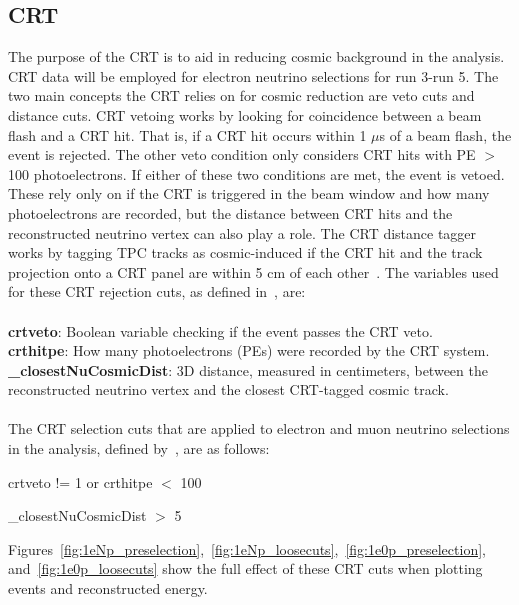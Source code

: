 \subsection{CRT}
The purpose of the CRT is to aid in reducing cosmic background in the analysis. CRT data will be employed for electron neutrino selections for run 3-run 5. The two main concepts the CRT relies on for cosmic reduction are veto cuts and distance cuts. CRT vetoing works by looking for coincidence between a beam flash and a CRT hit. That is, if a CRT hit occurs within 1 $\mu$s of a beam flash, the event is rejected. The other veto condition only considers CRT hits with PE \(>\) 100 photoelectrons. If either of these two conditions are met, the event is vetoed. These rely only on if the CRT is triggered in the beam window and how many photoelectrons are recorded, but the distance between CRT hits and the reconstructed neutrino vertex can also play a role. The CRT distance tagger works by tagging TPC tracks as cosmic-induced if the CRT hit and the track projection onto a CRT panel are within 5 cm of each other~\cite{PELEEnote}. The variables used for these CRT rejection cuts, as defined in~\cite{PELEEnote}, are:\\
\\
\textbf{crtveto}: Boolean variable checking if the event passes the CRT veto.\\
\textbf{crthitpe}: How many photoelectrons (PEs) were recorded by the CRT system.\\
\textbf{\_closestNuCosmicDist}: 3D distance, measured in centimeters, between the reconstructed neutrino vertex and the closest CRT-tagged cosmic track.\\
\\
The CRT selection cuts that are applied to electron and muon neutrino selections in the analysis, defined by~\cite{PELEEnote}, are as follows:

\begin{center}
    crtveto != 1  or crthitpe \(<\) 100 
\end{center}
\begin{center}
    \_closestNuCosmicDist \(>\) 5
\end{center}

Figures~\ref{fig:1eNp_preselection},~\ref{fig:1eNp_loosecuts},~\ref{fig:1e0p_preselection}, and~\ref{fig:1e0p_loosecuts} show the full effect of these CRT cuts when plotting events and reconstructed energy.

